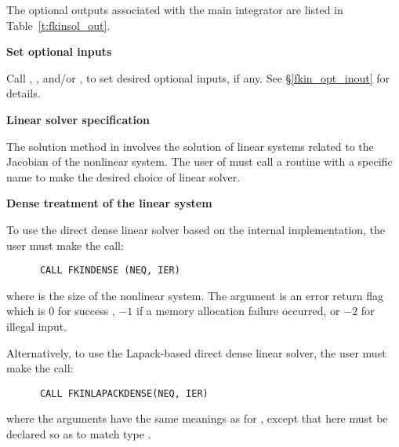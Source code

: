 \begin{Steps}
{    The optional outputs associated with the main {\kinsol} integrator
    are listed in Table~\ref{t:fkinsol_out}.
  }

\item\label{i:fkinsol_opt_input}{\bf Set optional inputs} 

  Call , , and/or , to set desired 
  optional inputs, if any.  See \S\ref{fkin_opt_inout} for details.

\item\label{i:fkinsol_lin_solv_spec}{\bf Linear solver specification} 

  The solution method in {\kinsol} involves the solution of linear systems 
  related to the Jacobian of the nonlinear system. The user of 
  {\fkinsol} must call a routine with a specific name to make the desired
  choice of linear solver.


  {\s} {\bf Dense treatment of the linear system}
  
  To use the direct dense linear solver based on the internal {\kinsol}
  implementation, the user must make the call:
\begin{verbatim}
      CALL FKINDENSE (NEQ, IER)
\end{verbatim}
  where  is the size of the nonlinear system.
  The argument  is an error return flag which is $0$ for success , 
  $-1$ if a memory allocation failure occurred, or $-2$ for illegal input.

  Alternatively, to use the Lapack-based direct dense linear solver, 
  the user must make the call:
\begin{verbatim}
      CALL FKINLAPACKDENSE(NEQ, IER)
\end{verbatim}
  where the arguments have the same meanings as for , except
  that here  must be declared so as to match {\C} type .


\end{Steps}
